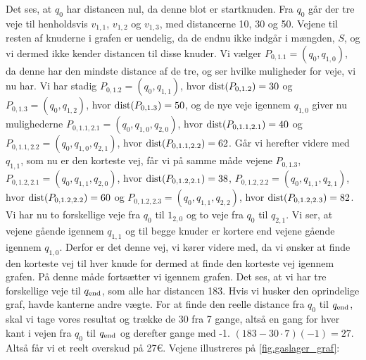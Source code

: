  


Det ses, at $q_0$ har distancen nul, da denne blot er startknuden. Fra $q_0$ går der tre veje til henholdsvis $v_{1,1}$, $v_{1,2}$ og $v_{1,3}$, med distancerne 10, 30 og 50. Vejene til resten af knuderne i grafen er uendelig, da de endnu ikke indgår i mængden, $S$, og vi dermed ikke kender distancen til disse knuder. Vi vælger $P_{0,1.1}=(q_0, q_{1,0})$, da denne har den mindste distance af de tre, og ser hvilke muligheder for veje, vi nu har. Vi har stadig $P_{0,1.2}=(q_{0},q_{1,1})$, hvor $\textrm{dist}(P_{0,1.2})=30$ og $P_{0,1.3}=(q_{0},q_{1,2})$, hvor $\textrm{dist}(P_{0,1.3})=50$, og de nye veje igennem $q_{1,0}$ giver nu mulighederne $P_{0,1.1,2.1}=(q_{0},q_{1,0},q_{2,0})$, hvor $\textrm{dist}(P_{0,1.1,2.1})=40$ og $P_{0,1.1,2.2}=(q_{0},q_{1,0},q_{2,1})$, hvor $\textrm{dist}(P_{0,1.1,2.2})=62$. Går vi herefter videre med $q_{1,1}$, som nu er den korteste vej, får vi på samme måde vejene $P_{0,1.3}$, $P_{0,1.2,2.1}=(q_{0},q_{1,1},q_{2,0})$, hvor $\textrm{dist}(P_{0,1.2,2.1})=38$, $P_{0,1.2,2.2}=(q_{0},q_{1,1},q_{2,1})$, hvor $\textrm{dist}(P_{0,1.2,2.2})=60$ og $P_{0,1.2,2.3}=(q_{0},q_{1,1},q_{2,2})$, hvor $\textrm{dist}(P_{0,1.2,2.3})=82$. Vi har nu to forskellige veje fra $q_{0}$ til $1_{2,0}$ og to veje fra $q_{0}$ til $q_{2,1}$. Vi ser, at vejene gående igennem $q_{1,1}$ og til begge knuder er kortere end vejene gående igennem $q_{1,0}$. Derfor er det denne vej, vi kører videre med, da vi ønsker at finde den korteste vej til hver knude for dermed at finde den korteste vej igennem grafen. På denne måde fortsætter vi igennem grafen. Det ses, at vi har tre forskellige veje til $q_{\textrm{end}}$, som alle har distancen 183. Hvis vi husker den oprindelige graf, havde kanterne andre vægte. For at finde den reelle distance fra $q_{0}$ til $q_{\textrm{end}}$, skal vi tage vores resultat og trække de 30 fra 7 gange, altså en gang for hver kant i vejen fra $q_{0}$ til $q_{\textrm{end}}$ og derefter gange med -1.
$(183-30 \cdot 7) (-1) = 27$. Altså får vi et reelt overskud på 27€.
Vejene illustreres på \autoref{fig.gaslager_graf}:





